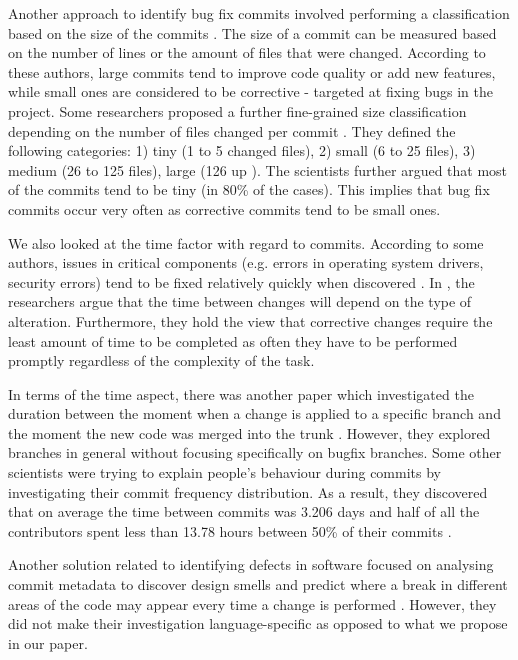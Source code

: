 Another approach to identify bug fix commits involved performing a classification based on the size of the commits \cite{Hattori2008,Mockus2000,Hindle2008}. The size of a commit can be measured based on the number of lines or the amount of files that were changed. According to these authors, large commits tend to improve code quality or add new features, while small ones are considered to be corrective - targeted at fixing bugs in the project. Some researchers proposed a further fine-grained size classification depending on the number of files changed per commit \cite{Hattori2008}. They defined the following categories: 1) tiny (1 to 5 changed files), 2) small (6 to 25 files), 3) medium (26 to 125 files), large (126 up ). The scientists further argued that most of the commits tend to be tiny (in 80\% of the cases). This implies that bug fix commits occur very often as corrective commits tend to be small ones.\par

We also looked at the time factor with regard to commits. According to some authors, issues in critical components (e.g. errors in operating system drivers, security errors) tend to be fixed relatively quickly when discovered \cite{Livshits2005}. In \cite{Mockus2000}, the researchers argue that the time between changes will depend on the type of alteration. Furthermore, they hold the view that corrective changes require the least amount of time to be completed as often they have to be performed promptly regardless of the complexity of the task.\par

In terms of the time aspect, there was another paper which investigated the duration between the moment when a change is applied to a specific branch and the moment the new code was merged into the trunk \cite{Williams2008}. However, they explored branches in general without focusing specifically on bugfix branches. Some other scientists were trying to explain people's behaviour during commits by investigating their commit frequency distribution. As a result, they discovered that on average the time between commits was 3.206 days and half of all the contributors spent less than 13.78 hours between 50\% of their commits \cite{Kolassa2013}.\par

Another solution related to identifying defects in software focused on analysing commit metadata to discover design smells and predict where a break in different areas of the code may appear every time a change is performed \cite{Oliva2013}. However, they did not make their investigation language-specific as opposed to what we propose in our paper.\par

